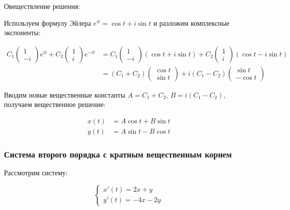 Овеществление решения:

Используем формулу Эйлера \(e^{i t} = \cos t + i \sin t\) и разложим комплексные экспоненты:

\begin{align*}
    C_1
    \begin{pmatrix} 1 \\ -i \end{pmatrix} e^{i t} +
    C_2
    \begin{pmatrix} 1 \\ i \end{pmatrix} e^{-i t}
    &= C_1
    \begin{pmatrix} 1 \\ -i \end{pmatrix} (\cos t + i \sin t) +
    C_2
    \begin{pmatrix} 1 \\ i \end{pmatrix} (\cos t - i \sin t) \\
    &= (C_1 + C_2)
    \begin{pmatrix} \cos t \\ \sin t \end{pmatrix} +
    i(C_1 - C_2)
    \begin{pmatrix} \sin t \\ -\cos t \end{pmatrix}
\end{align*}

Вводим новые вещественные константы \(A = C_1 + C_2\), \(B = i(C_1 - C_2)\), получаем вещественное решение:

\begin{align*}
    x(t) &= A \cos t + B \sin t \\
    y(t) &= A \sin t - B \cos t
\end{align*}

\subsubsection{Система второго порядка с кратным вещественным корнем}

Рассмотрим систему:

\begin{equation*}
    \begin{cases}
        x'(t) = 2x + y \\
        y'(t) = -4x - 2y
    \end{cases}
\end{equation*}

